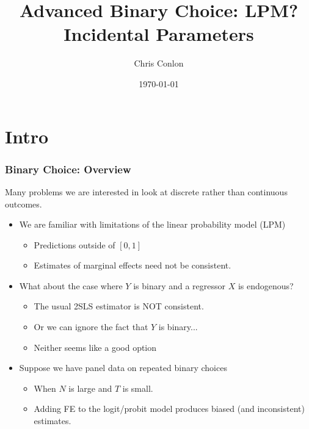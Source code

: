 \documentclass[xcolor=pdftex,dvipsnames,table,mathserif,aspectratio=169]{beamer}
\begin{document}
\title{Advanced Binary Choice: LPM? Incidental Parameters}
\author{Chris Conlon}
\date{\today}

\frame{\titlepage}

\section{Intro}

\begin{frame}
\frametitle{Binary Choice: Overview}
Many problems we are interested in look at discrete rather than continuous outcomes.
\begin{itemize}
\item We are familiar with limitations of the linear probability model (LPM)
\begin{itemize}
\item Predictions outside of $[0,1]$
\item Estimates of marginal effects need not be consistent.
\end{itemize}
\item What about the case where $Y$ is binary and a regressor $X$ is endogenous?
\begin{itemize}
\item The usual 2SLS estimator is \alert{NOT consistent}.
\item Or we can ignore the fact that $Y$ is binary...
\item Neither seems like a good option
\end{itemize}
\item Suppose we have panel data on repeated binary choices
\begin{itemize}
\item When $N$ is large and $T$ is small.
\item Adding FE to the logit/probit model produces biased (and inconsistent) estimates.
\end{itemize}
\end{itemize}
\end{frame}
\end{document}
